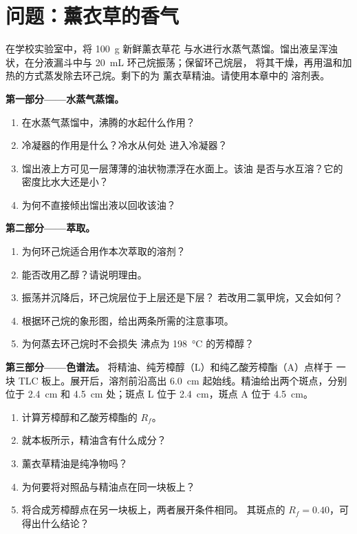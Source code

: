 \section{问题：薰衣草的香气}

\begin{problem}
\label{pb:g10:chemical-species:1}
在学校实验室中，将 \qty{100}{g} 新鲜薰衣草花
与水进行水蒸气蒸馏。馏出液呈浑浊状，在分液漏斗中与
\qty{20}{mL} 环己烷振荡；保留环己烷层，
将其干燥，再用温和加热的方式蒸发除去环己烷。剩下的为
薰衣草精油。请使用本章中的
溶剂表。

\medskip
\noindent\textbf{第一部分——水蒸气蒸馏。}
\begin{enumerate}
  \item 在水蒸气蒸馏中，沸腾的水起什么作用？
  \item 冷凝器的作用是什么？冷水从何处
        进入冷凝器？
  \item 馏出液上方可见一层薄薄的油状物漂浮在水面上。该油
        是否与水互溶？它的密度比水大还是小？
  \item 为何不直接倾出馏出液以回收该油？
\end{enumerate}

\medskip
\noindent\textbf{第二部分——萃取。}
\begin{enumerate}[resume]
  \item 为何环己烷适合用作本次萃取的溶剂？
  \item 能否改用乙醇？请说明理由。
  \item 振荡并沉降后，环己烷层位于上层还是下层？
        若改用二氯甲烷，又会如何？
  \item 根据环己烷的象形图，给出两条所需的注意事项。
  \item 为何蒸去环己烷时不会损失
        沸点为 \qty{198}{\celsius} 的芳樟醇？
\end{enumerate}

\medskip
\noindent\textbf{第三部分——色谱法。}
将精油、纯芳樟醇（L）和纯乙酸芳樟酯（A）点样于
一块 TLC 板上。展开后，溶剂前沿高出 \qty{6.0}{cm}
起始线。精油给出两个斑点，分别位于 \qty{2.4}{cm} 和
\qty{4.5}{cm} 处；斑点 L 位于 \qty{2.4}{cm}，斑点 A 位于 \qty{4.5}{cm}。
\begin{enumerate}[resume]
  \item 计算芳樟醇和乙酸芳樟酯的 $R_f$。
  \item 就本板所示，精油含有什么成分？
  \item 薰衣草精油是纯净物吗？
  \item 为何要将对照品与精油点在同一块板上？
  \item 将合成芳樟醇点在另一块板上，两者展开条件相同。
        其斑点的 $R_f = 0.40$，可得出什么结论？
\end{enumerate}


\end{problem}
